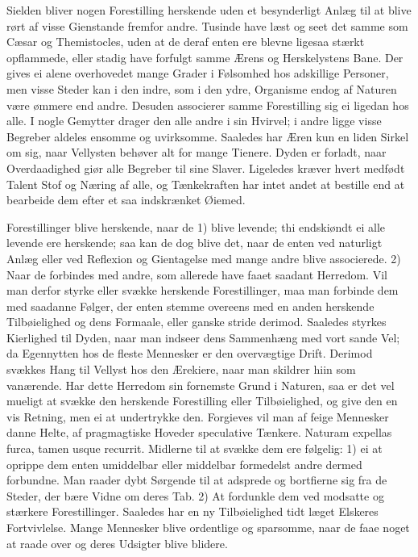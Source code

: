 \documentclass[12pt,a4paper]{article}
\newcommand{\opage}[1]{\marginnote{\footnotesize\textit{[#1]}}}
\begin{document}
\opage{103} Sielden bliver nogen Forestilling herskende uden et besynderligt Anlæg til at blive rørt
af visse Gienstande fremfor andre. Tusinde have læst og seet det samme som Cæsar og
Themistocles, uden at de deraf enten ere blevne ligesaa stærkt opflammede, eller stadig
have forfulgt samme Ærens og Herskelystens Bane. Der gives ei alene overhovedet mange
Grader i Følsomhed hos adskillige Personer, men visse Steder kan i den indre, som i den
ydre, Organisme endog af Naturen være ømmere end andre. Desuden associerer samme
Forestilling sig ei ligedan hos alle. I nogle Gemytter drager den alle andre i sin
Hvirvel; i andre ligge visse Begreber aldeles ensomme og uvirksomme. Saaledes har Æren
kun en liden Sirkel om sig, naar Vellysten behøver alt for mange Tienere. Dyden er
forladt, naar Overdaadighed giør alle Begreber til sine Slaver. Ligeledes kræver hvert
medfødt Talent Stof og Næring af alle, og Tænkekraften har intet andet at bestille end at
bearbeide dem efter et saa indskrænket Øiemed.

Forestillinger blive herskende, naar de 1) blive levende; thi endskiøndt ei alle levende
ere herskende; saa kan de dog blive det, naar de enten ved naturligt Anlæg eller ved
Reflexion og Gientagelse med mange andre blive associerede. 2) Naar de forbindes med
andre, som allerede have faaet saadant Herredom. Vil man derfor styrke eller svække
herskende Forestillinger, maa man forbinde dem med saadanne Følger, der enten
\opage{104} stemme overeens med en anden herskende Tilbøielighed og dens Formaale, eller ganske
stride derimod. Saaledes styrkes Kierlighed til Dyden, naar man indseer dens Sammenhæng
med vort sande Vel; da Egennytten hos de fleste Mennesker er den overvægtige Drift.
Derimod svækkes Hang til Vellyst hos den Ærekiere, naar man skildrer hiin som vanærende.
Har dette Herredom sin fornemste Grund i Naturen, saa er det vel mueligt at svække den
herskende Forestilling eller Tilbøielighed, og give den en vis Retning, men ei at
undertrykke den. Forgieves vil man af feige Mennesker danne Helte, af pragmagtiske
Hoveder speculative Tænkere. Naturam expellas furca, tamen usque recurrit. Midlerne til
at svække dem ere følgelig: 1) ei at oprippe dem enten umiddelbar eller middelbar
formedelst andre dermed forbundne. Man raader dybt Sørgende til at adsprede og bortfierne
sig fra de Steder, der bære Vidne om deres Tab. 2) At fordunkle dem ved modsatte og
stærkere Forestillinger. Saaledes har en ny Tilbøielighed tidt læget Elskeres
Fortvivlelse. Mange Mennesker blive ordentlige og sparsomme, naar de faae noget at raade
over og deres Udsigter blive blidere.
\end{document}
